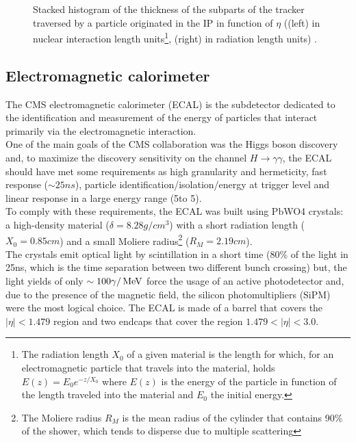\begin{figure}[h!]
\begin{minipage}{\linewidth}
\begin{minipage}{0.43\linewidth}
\end{minipage}
\caption[AAA]{Stacked histogram of the thickness of the subparts of the tracker traversed by a particle originated in the IP in function of $\eta$ ((left) in nuclear interaction length units\footnote{The radiation length $X_0$ of a given material is the length for which, for an electromagnetic particle that travels into the material, holds $E(z)=E_0 e^{-z/X_0}$ where $E(z)$ is the energy of the particle in function of the length traveled into the material and $E_0$ the initial energy.}, (right) in radiation length units)  \cite{TrackerMaterialBudgetplotsTWiki}.}
\end{minipage}

\end{figure}


\subsection{Electromagnetic calorimeter}
The CMS electromagnetic calorimeter (ECAL) \cite{HoferETHZurichHansHofer1997TheReport,Biino2015TheProjections} is the subdetector dedicated to the identification and measurement of the energy of particles that interact primarily via the electromagnetic interaction.\\
One of the main goals of the CMS collaboration was the Higgs boson discovery and, to maximize the discovery sensitivity on the channel $H \to \gamma \gamma$, the ECAL should have met some requirements as high granularity and hermeticity, fast response ($\sim 25ns$), particle identification/isolation/energy at trigger level and linear response in a large energy range (5\GeV to 5\TeV).\\
To comply with these requirements, the ECAL was built using PbWO4 crystals: a high-density material ($\delta=8.28g/cm^3$) with a short radiation length ($X_0=0.85cm$) and a small Moliere radius\footnote{The Moliere radius $R_M$ is the mean radius of the cylinder that contains 90\% of the shower, which tends to disperse due to multiple scattering} ($R_M=2.19cm$).\\
The crystals emit optical light by scintillation in a short time (80\% of the light in 25ns, which is the time separation between two different bunch crossing) but, the light yields of only $\sim 100 \gamma/{\,\text{Me\hspace{-.08em}V}}$ force the usage of an active photodetector and, due to the presence of the magnetic field, the silicon photomultipliers (SiPM) were the most logical choice.
The ECAL is made of a barrel that covers the $|\eta|<1.479$ region and two endcaps that cover the region $1.479<|\eta|<3.0$.
